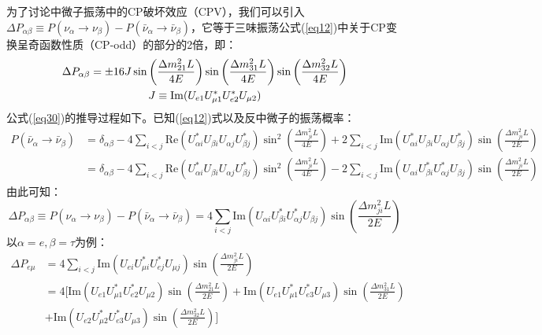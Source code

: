 \documentclass{article}
\begin{document}
	为了讨论中微子振荡中的CP破坏效应（CPV），我们可以引入$\Delta P_{\alpha\beta}\equiv P(\nu_\alpha\to\nu_\beta)-P(\bar{\nu}_\alpha\to\bar{\nu}_\beta)$，它等于三味振荡公式(\ref{eq12})中关于CP变换呈奇函数性质（CP-odd）的部分的2倍，即\cite{bilenky1980oscillations}\cite{barger1980cp}：
	\begin{gather}
		\Delta P_{\alpha\beta}=\pm 16J\sin\left(\frac{\Delta m_{21}^2L}{4E}\right)\sin\left(\frac{\Delta m_{31}^2L}{4E}\right)\sin\left(\frac{\Delta m_{32}^2L}{4E}\right) \label{eq30}\\ 
		J\equiv\mathrm{Im}(U_{e1}U_{\mu1}^*U_{e2}^*U_{\mu2}) \notag
	\end{gather}
	公式(\ref{eq30})的推导过程如下。已知(\ref{eq12})式以及反中微子的振荡概率：
	\begin{equation*}
		\begin{aligned}
			P(\bar{\nu}_\alpha\to\bar{\nu}_\beta)&=\delta_{\alpha\beta}-4\sum_{i<j}\mathrm{Re}(U_{\alpha i}^*U_{\beta i} U_{\alpha j} U_{\beta j}^*)\sin^2\left(\frac{\Delta m_{ji}^2L}{4E}\right)+2\sum_{i<j}\mathrm{Im}(U_{\alpha i}^*U_{\beta i} U_{\alpha j} U_{\beta j}^*)\sin\left(\frac{\Delta m_{ji}^2L}{2E}\right)\\
			&=\delta_{\alpha\beta}-4\sum_{i<j}\mathrm{Re}(U_{\alpha i}^*U_{\beta i} U_{\alpha j} U_{\beta j}^*)\sin^2\left(\frac{\Delta m_{ji}^2L}{4E}\right)-2\sum_{i<j}\mathrm{Im}(U_{\alpha i}U_{\beta i}^\ast U_{\alpha j}^\ast U_{\beta j})\sin\left(\frac{\Delta m_{ji}^2L}{2E}\right)
		\end{aligned}
	\end{equation*}
	由此可知：
	\begin{equation*}
		\Delta P_{\alpha\beta}\equiv P(\nu_\alpha\to\nu_\beta)-P(\bar{\nu}_\alpha\to\bar{\nu}_\beta)=4\sum_{i<j}\mathrm{Im}(U_{\alpha i}U_{\beta i}^\ast U_{\alpha j}^\ast U_{\beta j})\sin\left(\frac{\Delta m_{ji}^2L}{2E}\right)
	\end{equation*}
	以$\alpha=e,\beta=\tau$为例：
	\begin{equation*}
		\begin{aligned}
			\Delta P_{e\mu}&=4\sum_{i<j}\mathrm{Im}(U_{ei}U_{\mu i}^*U_{ej}^*U_{\mu j})\sin\left(\frac{\Delta m_{ji}^2L}{2E}\right)\\
			&=4\Bigg[\mathrm{Im}(U_{e1}U_{\mu1}^\ast U_{e2}^\ast U_{\mu2})\sin\left(\frac{\Delta m_{21}^2L}{2E}\right)+\mathrm{Im}(U_{e1}U_{\mu1}^\ast U_{e3}^\ast U_{\mu3})\sin\left(\frac{\Delta m_{31}^2L}{2E}\right)\\
			&+\mathrm{Im}(U_{e2}U_{\mu2}^\ast U_{e3}^\ast U_{\mu3})\sin\left(\frac{\Delta m_{32}^2L}{2E}\right)\Bigg]
		\end{aligned}
	\end{equation*}
\end{document}
